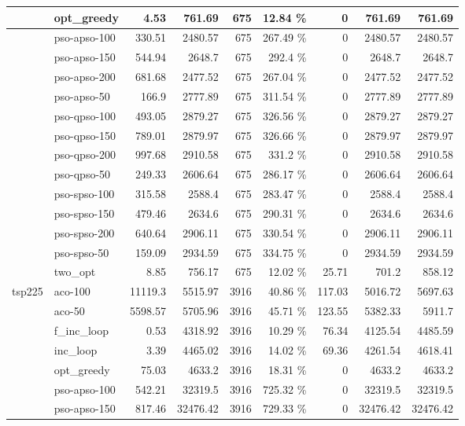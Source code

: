 \documentclass[conference]{IEEEtran}
\begin{document}
\begin{center}
\begin{longtable}[ht]{|l|l|r|r|r|r|r|r|r|}
 & opt\_greedy & 4.53 & 761.69 & 675 & 12.84 \% & 0 & 761.69 & 761.69 \\ \hline
 & pso-apso-100 & 330.51 & 2480.57 & 675 & 267.49 \% & 0 & 2480.57 & 2480.57 \\ \hline
 & pso-apso-150 & 544.94 & 2648.7 & 675 & 292.4 \% & 0 & 2648.7 & 2648.7 \\ \hline
 & pso-apso-200 & 681.68 & 2477.52 & 675 & 267.04 \% & 0 & 2477.52 & 2477.52 \\ \hline
 & pso-apso-50 & 166.9 & 2777.89 & 675 & 311.54 \% & 0 & 2777.89 & 2777.89 \\ \hline
 & pso-qpso-100 & 493.05 & 2879.27 & 675 & 326.56 \% & 0 & 2879.27 & 2879.27 \\ \hline
 & pso-qpso-150 & 789.01 & 2879.97 & 675 & 326.66 \% & 0 & 2879.97 & 2879.97 \\ \hline
 & pso-qpso-200 & 997.68 & 2910.58 & 675 & 331.2 \% & 0 & 2910.58 & 2910.58 \\ \hline
 & pso-qpso-50 & 249.33 & 2606.64 & 675 & 286.17 \% & 0 & 2606.64 & 2606.64 \\ \hline
 & pso-spso-100 & 315.58 & 2588.4 & 675 & 283.47 \% & 0 & 2588.4 & 2588.4 \\ \hline
 & pso-spso-150 & 479.46 & 2634.6 & 675 & 290.31 \% & 0 & 2634.6 & 2634.6 \\ \hline
 & pso-spso-200 & 640.64 & 2906.11 & 675 & 330.54 \% & 0 & 2906.11 & 2906.11 \\ \hline
 & pso-spso-50 & 159.09 & 2934.59 & 675 & 334.75 \% & 0 & 2934.59 & 2934.59 \\ \hline
 & two\_opt & 8.85 & 756.17 & 675 & 12.02 \% & 25.71 & 701.2 & 858.12 \\ \hline
tsp225 & aco-100 & 11119.3 & 5515.97 & 3916 & 40.86 \% & 117.03 & 5016.72 & 5697.63 \\ \hline
 & aco-50 & 5598.57 & 5705.96 & 3916 & 45.71 \% & 123.55 & 5382.33 & 5911.7 \\ \hline
 & f\_inc\_loop & 0.53 & 4318.92 & 3916 & 10.29 \% & 76.34 & 4125.54 & 4485.59 \\ \hline
 & inc\_loop & 3.39 & 4465.02 & 3916 & 14.02 \% & 69.36 & 4261.54 & 4618.41 \\ \hline
 & opt\_greedy & 75.03 & 4633.2 & 3916 & 18.31 \% & 0 & 4633.2 & 4633.2 \\ \hline
 & pso-apso-100 & 542.21 & 32319.5 & 3916 & 725.32 \% & 0 & 32319.5 & 32319.5 \\ \hline
 & pso-apso-150 & 817.46 & 32476.42 & 3916 & 729.33 \% & 0 & 32476.42 & 32476.42 \\ \hline

\end{longtable}
\end{center}
\end{document}
